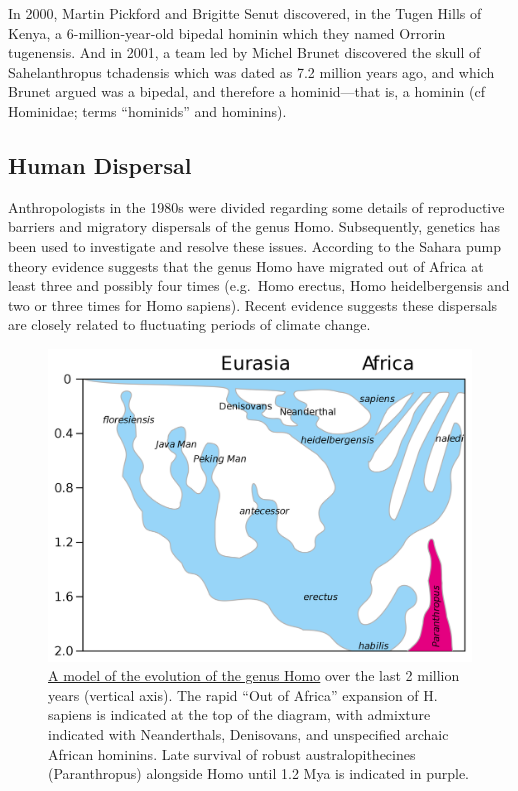 In 2000, Martin Pickford and Brigitte Senut discovered, in the Tugen Hills of Kenya, a 6-million-year-old bipedal hominin which they named Orrorin tugenensis. And in 2001, a team led by Michel Brunet discovered the skull of Sahelanthropus tchadensis which was dated as 7.2 million years ago, and which Brunet argued was a bipedal, and therefore a hominid---that is, a hominin (cf Hominidae; terms ``hominids'' and hominins).

\hypertarget{human-dispersal}{%
\subsection{Human Dispersal}\label{human-dispersal}}

Anthropologists in the 1980s were divided regarding some details of reproductive barriers and migratory dispersals of the genus Homo. Subsequently, genetics has been used to investigate and resolve these issues. According to the Sahara pump theory evidence suggests that the genus Homo have migrated out of Africa at least three and possibly four times (e.g.~Homo erectus, Homo heidelbergensis and two or three times for Homo sapiens). Recent evidence suggests these dispersals are closely related to fluctuating periods of climate change.



\begin{figure}

{\centering \includegraphics[width=0.7\linewidth]{./figures/animals/Homo_lineage_2017update} 

}

\caption{\href{https://en.wikipedia.org/wiki/Human_evolution\#/media/File:Homo_lineage_2017update.svg}{A model of the evolution of the genus Homo} over the last 2 million years (vertical axis). The rapid ``Out of Africa'' expansion of H. sapiens is indicated at the top of the diagram, with admixture indicated with Neanderthals, Denisovans, and unspecified archaic African hominins. Late survival of robust australopithecines (Paranthropus) alongside Homo until 1.2 Mya is indicated in purple.}\label{fig:humanevolution}
\end{figure}

